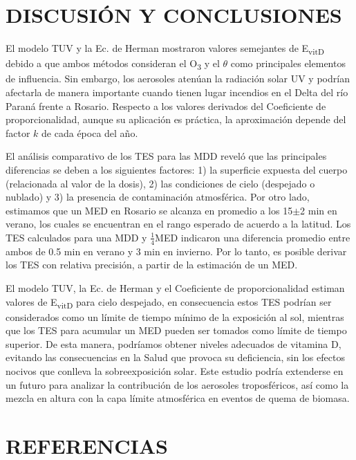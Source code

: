 \documentclass[10pt,twocolumn]{article}
\begin{document}
\section{DISCUSIÓN Y CONCLUSIONES}
El modelo TUV y la Ec. de Herman mostraron valores semejantes de E\textsubscript{vitD} debido a que ambos métodos consideran el O\textsubscript{3} y el $\theta$ como principales elementos de influencia. Sin embargo, los aerosoles atenúan la radiación solar UV y podrían afectarla de manera importante cuando tienen lugar incendios en el Delta del río Paraná frente a Rosario.\cite{IPINA2012966} Respecto a los valores derivados del Coeficiente de proporcionalidad, aunque su aplicación es práctica, la aproximación depende del factor $k$ de cada época del año.

El análisis comparativo de los TES para las MDD reveló que las principales diferencias se deben a los siguientes factores: 1) la superficie expuesta del cuerpo (relacionada al valor de la dosis), 2) las condiciones de cielo (despejado o nublado) y 3) la presencia de contaminación atmosférica. Por otro lado, estimamos que un MED en Rosario se alcanza en promedio a los 15$\pm$2 min en verano, los cuales se encuentran en el rango esperado de acuerdo a la latitud. Los TES calculados para una MDD y $\frac{1}{4}$MED indicaron una diferencia promedio entre ambos de 0.5 min en verano y 3 min en invierno. Por lo tanto, es posible derivar los TES con relativa precisión, a partir de la estimación de un MED.

El modelo TUV, la Ec. de Herman y el Coeficiente de proporcionalidad estiman valores de E\textsubscript{vitD} para cielo despejado, en consecuencia estos TES podrían ser considerados como un límite de tiempo mínimo de la exposición al sol, mientras que los TES para acumular un MED pueden ser tomados como límite de tiempo superior. De esta manera, podríamos obtener niveles adecuados de vitamina D, evitando las consecuencias en la Salud que provoca su deficiencia, sin los efectos nocivos que conlleva la sobreexposición solar. Este estudio podría extenderse en un futuro para analizar la contribución de los aerosoles troposféricos, así como la mezcla en altura con la capa límite atmosférica en eventos de quema de biomasa.
\section{REFERENCIAS}
\renewcommand{\refname}{}

\end{document}
